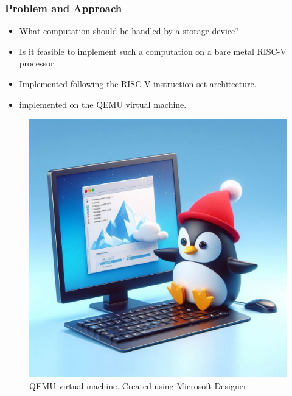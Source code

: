 \begin{frame}[hoved]
	\frametitle{Problem and Approach}
	\begin{minipage}[t]{0.45\textwidth}
		\begin{itemize}
			\item What computation should be handled by a storage device?
			\item Is it feasible to implement such a computation on a bare metal RISC-V
			      processor.
			\item Implemented following the RISC-V instruction set architecture.
			\item implemented on the QEMU virtual machine.
		\end{itemize}
	\end{minipage}
	\hfill
	\begin{minipage}[t]{0.45\textwidth}
		\begin{figure}
			\begin{center}
				\includegraphics[height=0.55\textheight]{figures/qemuvirt.jpeg}
			\end{center}
			\caption{QEMU virtual machine. {\tiny Created using Microsoft
						Designer}}\label{fig:qemu}
		\end{figure}
	\end{minipage}
\end{frame}

